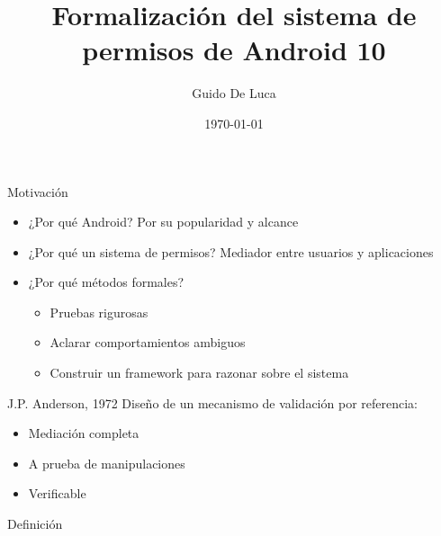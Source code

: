 \documentclass[pdf]{beamer} %
\title{Formalización del sistema de permisos de Android 10}
\author[Universidad Nacional de Rosario]{Guido De Luca}
\institute{Universidad Nacional de Rosario}
\date{\today}
\begin{document}
\begin{frame}[plain]
    \titlepage
\end{frame}

\begin{frame}{Motivación}
    \begin{itemize}
        \item ¿Por qué Android? \pause Por su popularidad y alcance \pause
        \item ¿Por qué un sistema de permisos? \pause Mediador entre usuarios y aplicaciones \pause
        \item ¿Por qué métodos formales? \pause
              \begin{itemize}[<+->]
                  \item Pruebas rigurosas
                  \item Aclarar comportamientos ambiguos
                  \item Construir un framework para razonar sobre el sistema
              \end{itemize}
    \end{itemize}
\end{frame}

\begin{frame}{J.P. Anderson, 1972}
    Diseño de un mecanismo de validación por referencia:
    \pause
    \begin{itemize}[<+->]
        \item Mediación completa
        \item A prueba de manipulaciones
        \item Verificable
    \end{itemize}

    \begin{block}{Definición}


    \end{block}
\end{frame}
\end{document}
